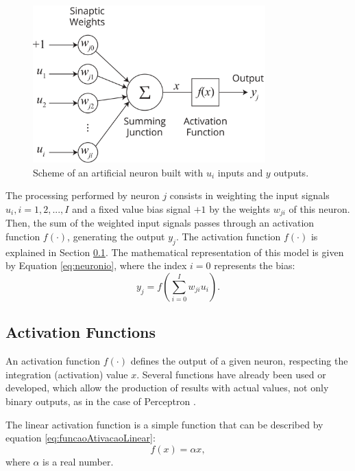 \begin{figure}[h!]
	\begin{center}
		\includegraphics[width=0.8\textwidth]{"Part 3 - Learning Systems/Supervised Learning/Multilayer Perceptron/neuronioArtificial.png"}
	\end{center}
\caption{Scheme of an artificial neuron built with $u_i$ inputs and $y$ outputs.}
	\label{fig:neuronio}
\end{figure}

The processing performed by neuron $j$ consists in weighting the input signals $u_i , i=1, 2,..., I$ and a fixed value bias signal $+1$ by the weights $w_{ji}$ of this neuron. Then, the sum of the weighted input signals passes through an activation function $f(\cdot)$, generating the output $y_j$. The activation function $f(\cdot)$ is explained in Section \ref{ssec:ativacao}. The mathematical representation of this model is given by Equation \ref{eq:neuronio}, where the index $i=0$ represents the bias:
\begin{equation}
    \label{eq:neuronio}
    y_j = f \left( \sum_{i=0}^I w_{ji} u_i  \right).
\end{equation}

\subsection{Activation Functions}
\label{ssec:ativacao}

An activation function $f(\cdot)$ defines the output of a given neuron, respecting the integration (activation) value $x$. Several functions have already been used or developed, which allow the production of results with actual values, not only binary outputs, as in the case of Perceptron \cite{haykin}.

The linear activation function is a simple function that can be described by equation \ref{eq:funcaoAtivacaoLinear}: \begin{equation}
	\label{eq:funcaoAtivacaoLinear}
	f(x) = \alpha x,
\end{equation}
\noindent where $\alpha$ is a real number.

